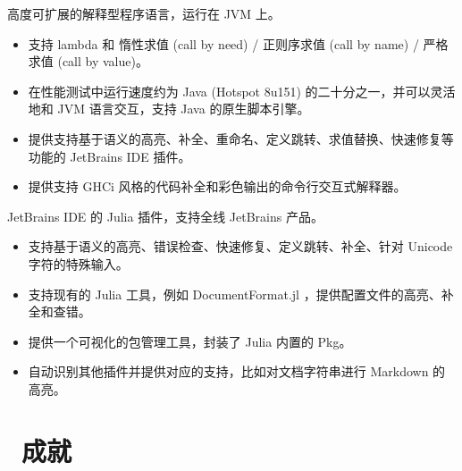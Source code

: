 \documentclass{resume}
\begin{document}
高度可扩展的解释型程序语言，运行在 JVM 上。
\begin{itemize}
  \item 支持 lambda 和 惰性求值 (call by need) / 正则序求值 (call by name) / 严格求值 (call by value)。
  \item 在性能测试中运行速度约为 Java (Hotspot 8u151) 的二十分之一，并可以灵活地和 JVM 语言交互，支持 Java 的原生脚本引擎。
  \item 提供支持基于语义的高亮、补全、重命名、定义跳转、求值替换、快速修复等功能的 JetBrains IDE 插件。
  \item 提供支持 GHCi 风格的代码补全和彩色输出的命令行交互式解释器。
\end{itemize}

JetBrains IDE 的 Julia 插件，支持全线 JetBrains 产品。
\begin{itemize}
  \item 支持基于语义的高亮、错误检查、快速修复、定义跳转、补全、针对 Unicode 字符的特殊输入。
  \item 支持现有的 Julia 工具，例如 DocumentFormat.jl ，提供配置文件的高亮、补全和查错。
  \item 提供一个可视化的包管理工具，封装了 Julia 内置的 Pkg。
  \item 自动识别其他插件并提供对应的支持，比如对文档字符串进行 Markdown 的高亮。
\end{itemize}


\section{\faHeartO\ 成就}
\end{document}
